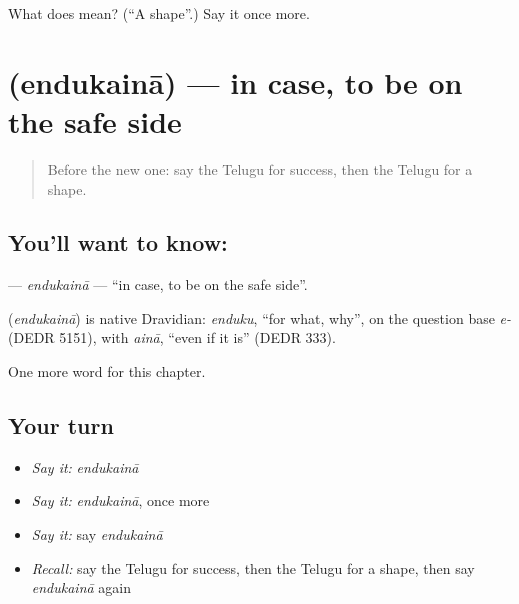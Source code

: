 \begin{tcolorbox}[breakable,colback=teal!4,colframe=teal!35!black,title={Before you move on}]
What does  mean? (\textquotedblleft{}A shape\textquotedblright{}.) Say it once more.
\end{tcolorbox}
\section[\texorpdfstring{\te{ఎందుకైనా} (endukainā)}{ఎందుకైనా (endukainā)}]{ (endukainā) — in case, to be on the safe side}

\label{lesson:TE-C295-endukaina}



\begin{quote}
Before the new one: say the Telugu for success, then the Telugu for a shape.
\end{quote}

\subsection*{You'll want to know: }
\textbf{} — \emph{endukainā} — \textquotedblleft{}in case, to be on the safe side\textquotedblright{}.

\begin{cousinweb}
\textbf{} (\emph{endukainā}) is native Dravidian: \emph{enduku}, \textquotedblleft{}for what, why\textquotedblright{}, on the question base \emph{e-} (DEDR 5151), with \emph{ainā}, \textquotedblleft{}even if it is\textquotedblright{} (DEDR 333).
\end{cousinweb}

\begin{grammarlens}[title={What you've built}]
One more word for this chapter.
\end{grammarlens}

\subsection*{Your turn}
\begin{itemize}
\raggedright
  \item \emph{Say it:} \emph{endukainā}
  \item \emph{Say it:} \emph{endukainā}, once more
  \item \emph{Say it:} say \emph{endukainā}
  \item \emph{Recall:} say the Telugu for success, then the Telugu for a shape, then say \emph{endukainā} again
\end{itemize}


